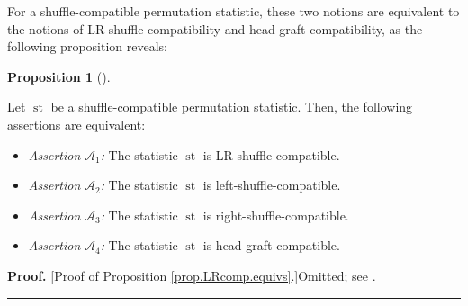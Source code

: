 \documentclass[numbers=enddot,12pt,final,onecolumn,notitlepage]{scrartcl}%
\theoremstyle{definition}
\newtheorem{prop}[theo]{Proposition}
\newenvironment{proposition}[1][]
{\begin{prop}[#1]\begin{leftbar}}
{\end{leftbar}\end{prop}}
\newenvironment{proof}[1][Proof]{\noindent\textbf{#1.} }{\ \rule{0.5em}{0.5em}}
\newenvironment{vershort}{}{}
\begin{document}
For a shuffle-compatible permutation statistic, these two notions are
equivalent to the notions of LR-shuffle-compatibility and
head-graft-compatibility, as the following proposition reveals:

\begin{proposition}
\label{prop.LRcomp.equivs}Let $\operatorname{st}$ be a shuffle-compatible
permutation statistic. Then, the following assertions are equivalent:

\begin{itemize}
\item \textit{Assertion }$\mathcal{A}_{1}$\textit{:} The statistic
$\operatorname{st}$ is LR-shuffle-compatible.

\item \textit{Assertion }$\mathcal{A}_{2}$\textit{:} The statistic
$\operatorname{st}$ is left-shuffle-compatible.

\item \textit{Assertion }$\mathcal{A}_{3}$\textit{:} The statistic
$\operatorname{st}$ is right-shuffle-compatible.

\item \textit{Assertion }$\mathcal{A}_{4}$\textit{:} The statistic
$\operatorname{st}$ is head-graft-compatible.
\end{itemize}
\end{proposition}

\begin{vershort}
\begin{proof}
[Proof of Proposition \ref{prop.LRcomp.equivs}.]Omitted; see \cite{verlong}.
\end{proof}
\end{vershort}
\end{document}
